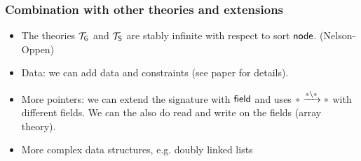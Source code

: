 \documentclass{beamer}
\begin{document}
\begin{frame}
  \frametitle{Combination with other theories and extensions}
  \begin{itemize}
  \item The theories $\mathcal{T}_{\mathsf{G}}$ and $\mathcal{T}_{\mathsf{S}}$ are stably infinite with respect to sort $\mathsf{node}$. (Nelson-Oppen)

  \item Data: we can add data and constraints (see paper for details). 


  \item More pointers: we can extend the signature with $\mathsf{field}$ and uses $\reachsymf$ with different fields.
  We can the also do read and write on the fields (array theory).

  \item More complex data structures, e.g. doubly linked lists


  \end{itemize}
\end{frame}

\section{\Tool}
\end{document}
